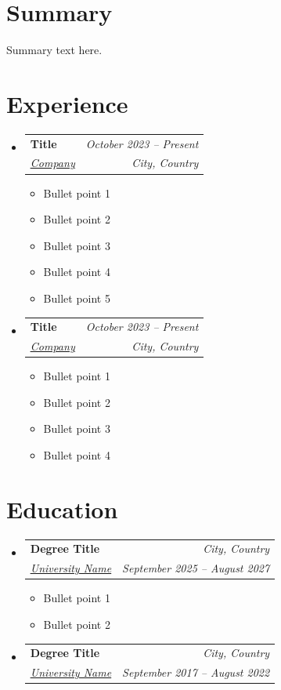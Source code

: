 \documentclass[a4,10pt]{article}
\makeatletter
\newcommand{\resumeItem}[1]{
  \item\small{
    {#1 \vspace*{1pt}}
  }
}
\newcommand{\resumeSubheading}[4]{
  \vspace*{1pt}\item
    \begin{tabular*}{0.97\textwidth}[t]{l@{\extracolsep{\fill}}r}
      \vspace*{2pt} \textbf{\normalsize\color{PrimaryColor}#1} & \textit{\normalsize\color{AccentColor}#2} \\
      \textit{\normalsize#3} & \textit{\normalsize\color{AccentColor}#4} \\
    \end{tabular*}\vspace*{0pt}
}
\newcommand{\resumeSubHeadingListStart}{\begin{itemize}[leftmargin=0.15in, label={}]}
\newcommand{\resumeSubHeadingListEnd}{\end{itemize}}
\newcommand{\resumeItemListStart}{\begin{itemize}}
\newcommand{\resumeItemListEnd}{\end{itemize}\vspace*{-2pt}}
\makeatother
\begin{document}
\section{Summary}
    \leftskip=0.15in \small Summary text here.\par\vspace*{-4pt}

\section{Experience}

  \resumeSubHeadingListStart

    \resumeSubheading
      {Title}{October 2023 -- Present}
      {\href{https://companylink.com}{\underline{Company}}}{City, Country}
      \resumeItemListStart
        \resumeItem{Bullet point 1}
        \resumeItem{Bullet point 2}
        \resumeItem{Bullet point 3}
        \resumeItem{Bullet point 4}
        \resumeItem{Bullet point 5}
      \resumeItemListEnd

    \resumeSubheading
      {Title}{October 2023 -- Present}
      {\href{https://companylink.com}{\underline{Company}}}{City, Country}
      \resumeItemListStart
        \resumeItem{Bullet point 1}
        \resumeItem{Bullet point 2}
        \resumeItem{Bullet point 3}
        \resumeItem{Bullet point 4}
      \resumeItemListEnd

  \resumeSubHeadingListEnd

\section{Education}
  \resumeSubHeadingListStart

    \resumeSubheading
      {Degree Title}{City, Country}
      {\href{https://www.universitylink.com}{\underline{University Name}}}{September 2025 -- August 2027}
      \resumeItemListStart
        \resumeItem{Bullet point 1}
        \resumeItem{Bullet point 2}
      \resumeItemListEnd

    \resumeSubheading
      {Degree Title}{City, Country}
      {\href{https://www.universitylink.com}{\underline{University Name}}}{September 2017 -- August 2022}

  \resumeSubHeadingListEnd

\end{document}
